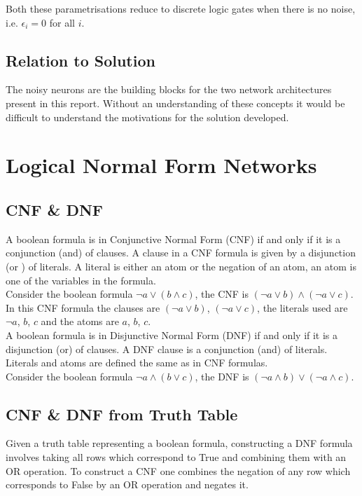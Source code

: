 Both these parametrisations reduce to discrete logic gates when there is no noise, i.e. $\epsilon_i = 0$ for all $i$.\\

\subsection{Relation to Solution}
The noisy neurons are the building blocks for the two network architectures present in this report. Without an understanding of these concepts it would be difficult to understand the motivations for the solution developed.

\section{Logical Normal Form Networks}
\subsection{CNF \& DNF}
A boolean formula is in Conjunctive Normal Form (CNF) if and only if it is a conjunction (and) of clauses. A clause in a CNF formula is given by a disjunction (or ) of literals. A literal is either an atom or the negation of an atom, an atom is one of the variables in the formula.\\

Consider the boolean formula $\lnot a \lor (b \land c)$, the CNF is $(\lnot a \lor b) \land (\lnot a \lor c)$. In this CNF formula the clauses are $(\lnot a \lor b)$, $(\lnot a \lor c)$, the literals used are $\lnot a$, $b$, $c$ and the atoms are $a$, $b$, $c$.\\

A boolean formula is in Disjunctive Normal Form (DNF) if and only if it is a disjunction (or) of clauses. A DNF clause is a conjunction (and) of literals. Literals and atoms are defined the same as in CNF formulas.\\

Consider the boolean formula $\lnot a \land (b \lor c)$, the DNF is $(\lnot a \land b) \lor (\lnot a \land c)$.\\

\subsection{CNF \& DNF from Truth Table} \label{subsec:construct-cnfdnf}
Given a truth table representing a boolean formula, constructing a DNF formula involves taking all rows which correspond to True and combining them with an OR operation. To construct a CNF one combines the negation of any row which corresponds to False by an OR operation and negates it.

